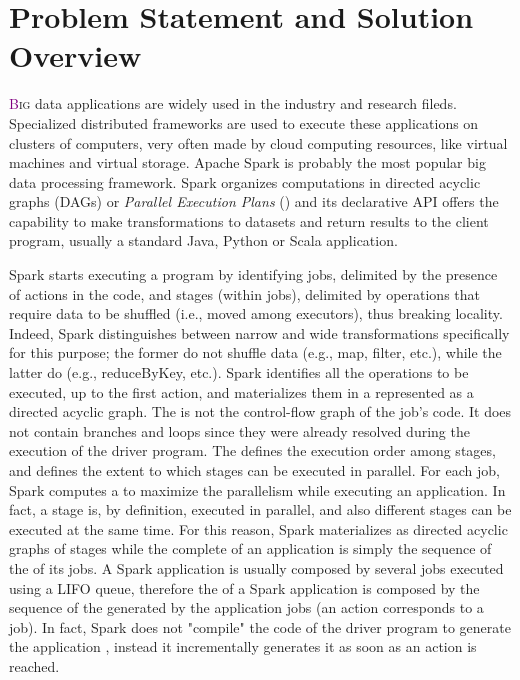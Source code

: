 \chapter{Problem Statement and Solution Overview} \label{chap:ProblemAndSolution}

\lettrine[lines=4]{\textcolor{purple}{B}}{ig} data applications are widely used in the industry and research fileds. Specialized   distributed frameworks are used to execute these applications on clusters of computers, very often made by cloud computing resources, like virtual machines and virtual storage. Apache Spark is probably the most popular big data processing framework. Spark organizes computations in directed acyclic graphs (DAGs) or  \textit{Parallel Execution Plans} (\plans) and its declarative API offers the capability to make transformations to datasets and return results to the client program, usually a standard Java, Python or Scala application. 

Spark starts executing a program by identifying jobs, delimited by the presence of actions in the code, and stages (within jobs), delimited by operations that require data to be shuffled (i.e., moved among executors), thus breaking locality. Indeed, Spark distinguishes
between narrow and wide transformations specifically for this purpose; the former do not shuffle data (e.g., map, filter, etc.), while the latter do (e.g., reduceByKey, etc.). Spark identifies all the operations to be executed, up to the first action, and
materializes them in a \plan represented as a directed acyclic graph. The \plan is not the control-flow graph of the job’s code. It does not contain branches and loops since they were already resolved during the execution of the driver program. The \plan defines the execution order among stages, and defines the extent to which stages can be executed in parallel. For each job, Spark computes a \plan to maximize the parallelism while executing an application. In fact, a stage is, by definition, executed in parallel, and also different stages can be executed at the same time. For this reason, Spark materializes \plans as directed acyclic graphs of stages while the complete \plan of an application is simply the sequence of the \plans of its jobs. A Spark application is usually composed by several jobs executed using a LIFO queue, therefore the \plan of a Spark application is composed by the sequence of the \plans generated by the application jobs (an action corresponds to a job). In fact, Spark does not "compile" the code of the driver program to generate the application \plan, instead it incrementally generates it as soon as an action is reached.

